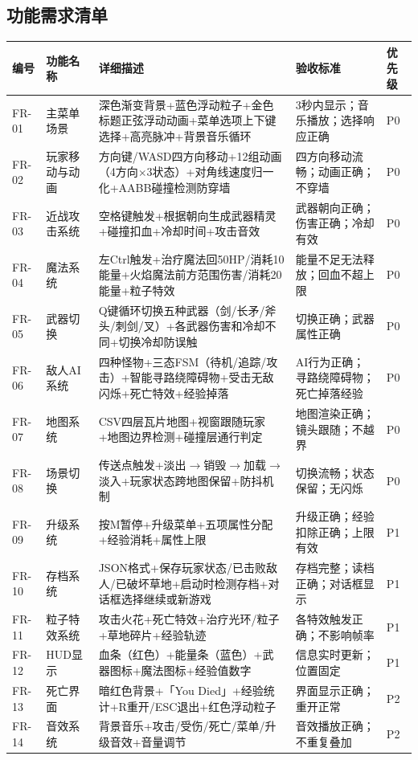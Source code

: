 \documentclass[12pt,a4paper]{article}
\begin{document}
\subsection{功能需求清单}

\begin{longtable}{p{1.5cm}p{2cm}p{5.5cm}p{4cm}p{1cm}}
\toprule
\textbf{编号} & \textbf{功能名称} & \textbf{详细描述} & \textbf{验收标准} & \textbf{优先级} \\
\midrule
\endhead
FR-01 & 主菜单场景 & 深色渐变背景+蓝色浮动粒子+金色标题正弦浮动动画+菜单选项上下键选择+高亮脉冲+背景音乐循环 & 3秒内显示；音乐播放；选择响应正确 & P0 \\
FR-02 & 玩家移动与动画 & 方向键/WASD四方向移动+12组动画（4方向$\times$3状态）+对角线速度归一化+AABB碰撞检测防穿墙 & 四方向移动流畅；动画正确；不穿墙 & P0 \\
FR-03 & 近战攻击系统 & 空格键触发+根据朝向生成武器精灵+碰撞扣血+冷却时间+攻击音效 & 武器朝向正确；伤害正确；冷却有效 & P0 \\
FR-04 & 魔法系统 & 左Ctrl触发+治疗魔法回50HP/消耗10能量+火焰魔法前方范围伤害/消耗20能量+粒子特效 & 能量不足无法释放；回血不超上限 & P0 \\
FR-05 & 武器切换 & Q键循环切换五种武器（剑/长矛/斧头/刺剑/叉）+各武器伤害和冷却不同+切换冷却防误触 & 切换正确；武器属性正确 & P0 \\
FR-06 & 敌人AI系统 & 四种怪物+三态FSM（待机/追踪/攻击）+智能寻路绕障碍物+受击无敌闪烁+死亡特效+经验掉落 & AI行为正确；寻路绕障碍物；死亡掉落经验 & P0 \\
FR-07 & 地图系统 & CSV四层瓦片地图+视窗跟随玩家+地图边界检测+碰撞层通行判定 & 地图渲染正确；镜头跟随；不越界 & P0 \\
FR-08 & 场景切换 & 传送点触发+淡出$\rightarrow$销毁$\rightarrow$加载$\rightarrow$淡入+玩家状态跨地图保留+防抖机制 & 切换流畅；状态保留；无闪烁 & P0 \\
FR-09 & 升级系统 & 按M暂停+升级菜单+五项属性分配+经验消耗+属性上限 & 升级正确；经验扣除正确；上限有效 & P1 \\
FR-10 & 存档系统 & JSON格式+保存玩家状态/已击败敌人/已破坏草地+启动时检测存档+对话框选择继续或新游戏 & 存档完整；读档正确；对话框显示 & P1 \\
FR-11 & 粒子特效系统 & 攻击火花+死亡特效+治疗光环/粒子+草地碎片+经验轨迹 & 各特效触发正确；不影响帧率 & P1 \\
FR-12 & HUD显示 & 血条（红色）+能量条（蓝色）+武器图标+魔法图标+经验值数字 & 信息实时更新；位置固定 & P1 \\
FR-13 & 死亡界面 & 暗红色背景+「You Died」+经验统计+R重开/ESC退出+红色浮动粒子 & 界面显示正确；重开正常 & P2 \\
FR-14 & 音效系统 & 背景音乐+攻击/受伤/死亡/菜单/升级音效+音量调节 & 音效播放正确；不重复叠加 & P2 \\
\bottomrule
\end{longtable}
\end{document}
